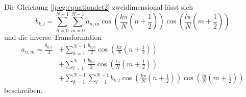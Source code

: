 Die Gleichung \eqref{jpeg:equationdct2} zweidimensional lässt sich
\begin{equation}
    b_{k,l}
    =
    \sum \limits_{n=0}^{N-1} 
    \sum \limits_{m=0}^{N-1} a_{n,m} 
    \cos\left(
    \frac{k\pi}{N}\left(n + \frac{1}{2} \right) 
    \right)
    \cos\left(
    \frac{l\pi}{N}\left(m + \frac{1}{2} \right) 
    \right)
    \label{jpeg:equationdct2dim2}
\end{equation}
und die inverse Transformation  
\begin{align*}
    a_{n,m}
    =
    \frac{b_{0,0}}{4} &+
    \sum \limits_{k=1}^{N-1} 
    \frac{b_{k,0}}{2} 
    \cos\left(
    \frac{k\pi}{N}\left(n + \frac{1}{2} \right) 
    \right) \\ &+
    \sum \limits_{l=1}^{N-1} 
    \frac{b_{0,l}}{2} 
    \cos\left(
    \frac{l\pi}{N}\left(m + \frac{1}{2} \right) 
    \right) \\ &+
    \sum \limits_{k=1}^{N-1} 
    \sum \limits_{l=1}^{N-1} b_{k,l} 
    \cos\left(
    \frac{k\pi}{N}\left(n + \frac{1}{2} \right) 
    \right)
    \cos\left(
    \frac{l\pi}{N}\left(m + \frac{1}{2} \right) 
    \right)
    \label{jpeg:equationdct3dim2}
\end{align*}
beschreiben.
